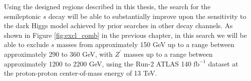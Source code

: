 Using the designed regions described in this thesis, the search for the semileptonic $s$ decay will be able to substantially improve upon the sensitivity to the dark Higgs model achieved by prior searches in other decay channels. As shown in Figure \ref{fig:excl_comb} in the previous chapter, in this search we will be able to exclude $s$ masses from approximately 150 GeV up to a range between approximately 290 to 360 GeV, with $Z^\prime$ masses up to a range between approximately 1200 to 2200 GeV, using the Run-2 ATLAS 140 $\text{fb}^{-1}$ dataset at the proton-proton center-of-mass energy of 13 TeV.
